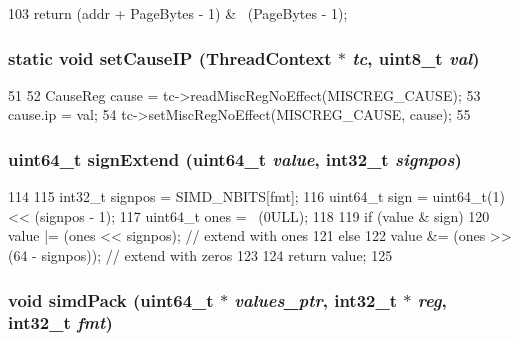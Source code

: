 \begin{DoxyCode}
103 { return (addr + PageBytes - 1) & ~(PageBytes - 1); }
\end{DoxyCode}
\hypertarget{namespaceMipsISA_a86679a616188423fd4ee481c0c8badf5}{
\subsubsection[{setCauseIP}]{\setlength{\rightskip}{0pt plus 5cm}static void setCauseIP ({\bf ThreadContext} $\ast$ {\em tc}, \/  uint8\_\-t {\em val})}}
\label{namespaceMipsISA_a86679a616188423fd4ee481c0c8badf5}



\begin{DoxyCode}
51                                            {
52     CauseReg cause = tc->readMiscRegNoEffect(MISCREG_CAUSE);
53     cause.ip = val;
54     tc->setMiscRegNoEffect(MISCREG_CAUSE, cause);
55 }
\end{DoxyCode}
\hypertarget{namespaceMipsISA_a769dba9c69d884afe2d99cd0fcdb17bb}{
\subsubsection[{signExtend}]{\setlength{\rightskip}{0pt plus 5cm}uint64\_\-t signExtend (uint64\_\-t {\em value}, \/  int32\_\-t {\em signpos})}}
\label{namespaceMipsISA_a769dba9c69d884afe2d99cd0fcdb17bb}



\begin{DoxyCode}
114 {
115     int32_t signpos = SIMD_NBITS[fmt];
116     uint64_t sign = uint64_t(1) << (signpos - 1);
117     uint64_t ones = ~(0ULL);
118 
119     if (value & sign)
120         value |= (ones << signpos); // extend with ones
121     else
122         value &= (ones >> (64 - signpos)); // extend with zeros
123 
124     return value;
125 }
\end{DoxyCode}
\hypertarget{namespaceMipsISA_a74fad38caeb362b68c915e1255139c92}{
\subsubsection[{simdPack}]{\setlength{\rightskip}{0pt plus 5cm}void simdPack (uint64\_\-t $\ast$ {\em values\_\-ptr}, \/  int32\_\-t $\ast$ {\em reg}, \/  int32\_\-t {\em fmt})}}
\label{namespaceMipsISA_a74fad38caeb362b68c915e1255139c92}



